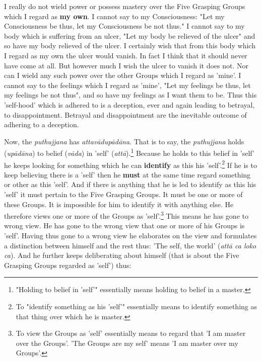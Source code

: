 I really do not wield power or possess mastery over the Five Grasping
Groups which I regard as \textbf{my own}. I cannot say to my Consciousness:
"Let my Consciousness be thus, let my Consciousness be not thus." I
cannot say to my body which is suffering from an ulcer, "Let my body be
relieved of the ulcer" and so have my body relieved of the ulcer. I
certainly wish that from this body which I regard as my own the ulcer
would vanish. In fact I think that it should never have come at all. But
however much I wish the ulcer to vanish it does not. Nor can I wield any
such power over the other Groups which I regard as 'mine'. I cannot say
to the feelings which I regard as 'mine', "Let my feelings be thus, let
my feelings be not thus", and so have my feelings as I want them to be.
Thus this 'self-hood' which is adhered to is a deception, ever and again
leading to betrayal, to disappointment. Betrayal and disappointment are
the inevitable outcome of adhering to a deception.


Now, the \emph{puthujjana} has \emph{attavādupādāna}. That is to say, the
\emph{puthujjana} holds (\emph{upādāna}) to belief (\emph{vāda}) in 'self'
(\emph{attā}).\footnote{"Holding to belief in 'self'" essentially means holding to belief in a master.} Because he holds to this belief in
'self' he keeps looking for something which he can \textbf{identify} as this
his 'self'.\footnote{To "identify something as his 'self'" essentially means to identify something as that thing over which he is master.} If
he is to keep believing there is a 'self' then he \textbf{must} at the same
time regard something or other as this 'self'. And if there is anything
that he is led to identify as this his 'self' it must pertain to the
Five Grasping Groups. It must be one or more of these Groups. It is
impossible for him to identify it with anything else. He therefore views
one or more of the Groups as 'self'.\footnote{To view the Groups as 'self' essentially means to regard that 'I am master over the Groups'. 'The Groups are my self' means 'I am master over my Groups'.} This means
he has gone to wrong view. He has gone to the wrong view that one or
more of his Groups is 'self'. Having thus gone to a wrong view he
elaborates on the view and formulates a distinction between himself and
the rest thus: 'The self, the world' (\emph{attā ca loko ca}). And he
further keeps deliberating about himself (that is about the Five
Grasping Groups regarded as 'self') thus:


